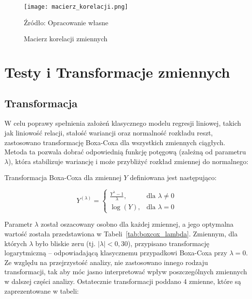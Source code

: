 \documentclass[12pt, twoside]{article}
\begin{document}
\begin{figure}[H]
    \centering
    \texttt{[image: macierz\_korelacji.png]}
    \caption{Macierz korelacji zmiennych}
    \label{fig:correlation}
    \vspace{0.1cm}
    {\parbox[t]{\linewidth}{\raggedright Źródło: Opracowanie własne}}

\end{figure}


\section{Testy i Transformacje zmiennych}
\subsection*{Transformacja}



W celu poprawy spełnienia założeń klasycznego modelu regresji liniowej, takich jak liniowość relacji, stałość wariancji oraz normalność rozkładu reszt, zastosowano transformację Boxa-Coxa dla wszystkich zmiennych ciągłych. Metoda ta pozwala dobrać odpowiednią funkcję potęgową (zależną od parametru $\lambda$), która stabilizuje wariancję i może przybliżyć rozkład zmiennej do normalnego:

Transformacja Boxa-Coxa dla zmiennej $Y$ definiowana jest następująco:

\[
Y^{(\lambda)} =
\begin{cases}
\displaystyle \frac{Y^\lambda - 1}{\lambda}, & \text{dla } \lambda \neq 0 \\
\log(Y), & \text{dla } \lambda = 0
\end{cases}
\]

Parametr $\lambda$ został oszacowany osobno dla każdej zmiennej, a jego optymalna wartość została przedstawiona w Tabeli~\ref{tab:boxcox_lambda}. Zmiennym, dla których $\lambda$ było bliskie zeru (tj. $|\lambda| < 0{,}30$), przypisano transformację logarytmiczną – odpowiadającą klasycznemu przypadkowi Boxa-Coxa przy $\lambda = 0$. Ze względu na przejrzystość analizy, nie zastosowano innego rodzaju transformacji, tak aby móc jasno interpretować wpływ poszczególnych zmiennych w dalszej części analizy. Ostatecznie transformacji poddano 4 zmienne, które są zaprezentowane w tabeli:
\end{document}
